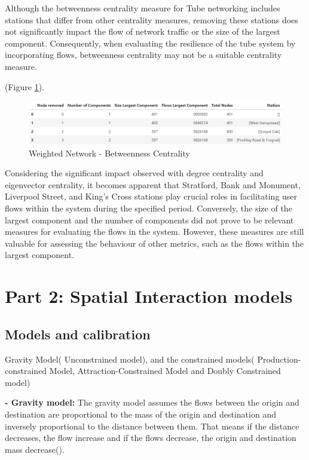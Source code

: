 \documentclass[10pt]{report}
\numberwithin{figure}{section}
\numberwithin{table}{section}
\begin{document}
Although the betweenness centrality measure for Tube networking includes stations that differ from other centrality measures, removing these stations does not significantly impact the flow of network traffic or the size of the largest component. Consequently, when evaluating the resilience of the tube system by incorporating flows, betweenness centrality may not be a suitable centrality measure.

(Figure \ref{fig:Table_Flows_Betweenness}). 
    \begin{figure}[htp]
        \centering
        \includegraphics[width=14cm]{Image/Table_Flows_Betweenness.png}
        \caption{Weighted Network - Betweenness Centrality}
        \label{fig:Table_Flows_Betweenness}
    \end{figure}

Considering the significant impact observed with degree centrality and eigenvector centrality, it becomes apparent that Stratford, Bank and Monument, Liverpool Street, and King's Cross stations play crucial roles in facilitating user flows within the system during the specified period. Conversely, the size of the largest component and the number of components did not prove to be relevant measures for evaluating the flows in the system. However, these measures are still valuable for assessing the behaviour of other metrics, such as the flows within the largest component.

\newpage 

\section{ Part 2: Spatial Interaction models}

\subsection{Models and calibration}

Gravity Model( Unconstrained model), and the constrained models( Production-constrained Model, Attraction-Constrained Model and Doubly Constrained model)

\vspace{5mm} %

\textbf{- Gravity model:}
The gravity model assumes the flows between the origin and destination are proportional to the mass of the origin and destination and inversely proportional to the distance between them. That means if the distance decreases, the flow increase and if the flows decrease, the origin and destination mass decrease(\cite{wilson_family_1971, senior_gravity_1979}).
\end{document}
